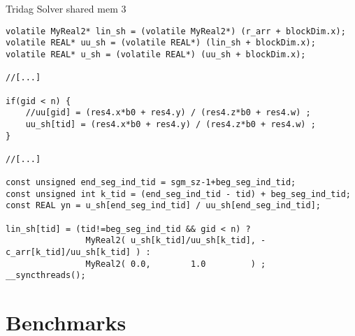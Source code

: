 \documentclass[xcolor=x11names,compress]{beamer}
\begin{document}
\begin{frame}[fragile]{Tridag Solver shared mem 3}
\begin{verbatim}
volatile MyReal2* lin_sh = (volatile MyReal2*) (r_arr + blockDim.x);
volatile REAL* uu_sh = (volatile REAL*) (lin_sh + blockDim.x);
volatile REAL* u_sh = (volatile REAL*) (uu_sh + blockDim.x);

//[...]

if(gid < n) {
    //uu[gid] = (res4.x*b0 + res4.y) / (res4.z*b0 + res4.w) ;
    uu_sh[tid] = (res4.x*b0 + res4.y) / (res4.z*b0 + res4.w) ;
}

//[...]

const unsigned end_seg_ind_tid = sgm_sz-1+beg_seg_ind_tid;
const unsigned int k_tid = (end_seg_ind_tid - tid) + beg_seg_ind_tid;  
const REAL yn = u_sh[end_seg_ind_tid] / uu_sh[end_seg_ind_tid];

lin_sh[tid] = (tid!=beg_seg_ind_tid && gid < n) ?
                MyReal2( u_sh[k_tid]/uu_sh[k_tid], -c_arr[k_tid]/uu_sh[k_tid] ) :
                MyReal2( 0.0,        1.0         ) ;
__syncthreads();
\end{verbatim}
\end{frame}


\section{Benchmarks}
\end{document}
